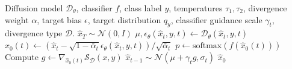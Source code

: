 \documentclass{article}
\begin{document}
\begin{algorithm}
\caption{DDPM $f$-Divergence Guided Sampling}
\label{alg:f-divergence-guided}
\begin{algorithmic}[1]
\Require Diffusion model $\mathcal{D}_\theta$, classifier $f$, class label $y$, temperatures $\tau_1, \tau_2$, divergence weight $\alpha$, target bias $\epsilon$, target distribution $q_y$, classifier guidance scale $\gamma_t$, divergence type $\mathcal{D}$.
\State $\hat{x}_T \sim \mathcal{N}(0, I)$
    \State $\mu, \epsilon_\theta(\hat{x}_t, y, t) \leftarrow \mathcal{D}_\theta(\hat{x}_t, y, t)$
    \State $\hat{x}_0(t) \leftarrow (\hat{x}_t - \sqrt{1-\bar{\alpha}_t} \epsilon_\theta(\hat{x}_t, y, t)) / \sqrt{\bar{\alpha}_t}$ 
    \State $p \leftarrow \text{softmax}(f(\hat{x}_0(t)))$ 
    \State Compute $g \leftarrow \nabla_{\hat{x}_0(t)} \mathcal{S}_{\mathcal{D}}(x, y)$ 
    \State $\hat{x}_{t-1} \sim \mathcal{N}(\mu + \gamma_t g, \sigma_t)$
\EndFor
\State \Return $\hat{x}_0$
\end{algorithmic}
\end{algorithm}
\end{document}
